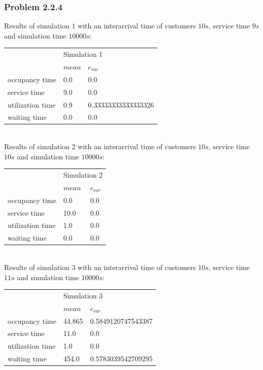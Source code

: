 \subsubsection*{Problem 2.2.4}
Results of simulation $1$ with an interarrival time of customers $10s$, service time $9s$ and simulation time $10000s$:
\begin{table}[h]
\centering
\begin{tabular}{|l|l|l|}
\hline
\multirow{2}{*}{} & \multicolumn{2}{l|}{Simulation 1} \\ \cline{2-3} 
                  & $mean$        & $c_{var}$      \\ \hline
occupancy time    & 0.0           & 0.0             \\ \hline
service time      & 9.0           & 0.0             \\ \hline
utilization time  & 0.9           & 0.33333333333333326              \\ \hline
waiting time & 0.0         & 0.0             \\ \hline
\end{tabular}
\end{table}\\
Results of simulation $2$ with an interarrival time of customers $10s$, service time $10s$ and simulation time $10000s$:
\begin{table}[h]
\centering
\begin{tabular}{|l|l|l|}
\hline
\multirow{2}{*}{} & \multicolumn{2}{l|}{Simulation 2} \\ \cline{2-3} 
                  & $mean$        & $c_{var}$      \\ \hline
occupancy time      & 0.0           & 0.0            \\ \hline
service time      & 10.0           & 0.0            \\ \hline
utilization time  & 1.0           & 0.0             \\ \hline
waiting time & 0.0         & 0.0             \\ \hline
\end{tabular}
\end{table}\\
Results of simulation $3$ with an interarrival time of customers $10s$, service time $11s$ and simulation time $10000s$:
\begin{table}[h]
\centering
\begin{tabular}{|l|l|l|}
\hline
\multirow{2}{*}{} & \multicolumn{2}{l|}{Simulation 3} \\ \cline{2-3} 
                  & $mean$        & $c_{var}$      \\ \hline
occupancy time      & 44.865           & 0.5849120747543387            \\ \hline
service time      & 11.0           & 0.0            \\ \hline
utilization time  & 1.0           & 0.0             \\ \hline
waiting time & 454.0         & 0.5783039542709295             \\ \hline
\end{tabular}
\end{table}\\
